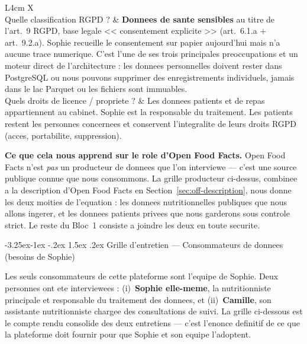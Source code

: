 \documentclass[a4paper,11pt,oneside,openany]{report}
\makeatletter
\renewcommand\subsection{\@startsection{subsection}{2}{\z@}%
  {-3.25ex\@plus -1ex \@minus -.2ex}%
  {1.5ex \@plus .2ex}%
  {\normalfont\large\bfseries\color{ntdarkgreen}}}
\newcommand{\off}{Open Food Facts}
\newcommand{\rgpd}{RGPD}
\makeatother
\begin{document}
\begin{table}[H]
\begin{tabularx}{\textwidth}{L{4cm} X}
\\
\addlinespace
Quelle classification \rgpd{} ? &
\textbf{Donnees de sante sensibles} au titre de l'art.~9 \rgpd{},
base legale << consentement explicite >> (art.~6.1.a $+$ art.~9.2.a).
Sophie recueille le consentement sur papier aujourd'hui mais n'a
aucune trace numerique. C'est l'une de ses trois principales
preoccupations et un moteur direct de l'architecture : les donnees
personnelles doivent rester dans PostgreSQL ou nous pouvons supprimer
des enregistrements individuels, jamais dans le lac Parquet ou les
fichiers sont immuables.
\\
\addlinespace
Quels droits de licence / propriete ? &
Les donnees patients et de repas appartiennent au cabinet. Sophie est
la responsable du traitement. Les patients restent les personnes
concernees et conservent l'integralite de leurs droits \rgpd{}
(acces, portabilite, suppression).
\\
\bottomrule
\end{tabularx}
\end{table}

\noindent\textbf{Ce que cela nous apprend sur le role d'\off{}.} \off{}
n'est \emph{pas} un producteur de donnees que l'on interviewe --- c'est
une source publique connue que nous consommons. La grille producteur
ci-dessus, combinee a la description d'\off{} en
Section~\ref{sec:off-description}, nous donne les deux moities de
l'equation : les donnees nutritionnelles publiques que nous allons
ingerer, et les donnees patients privees que nous garderons sous
controle strict. Le reste du Bloc~1 consiste a joindre les deux en
toute securite.

\subsection{Grille d'entretien --- Consommateurs de donnees (besoins de Sophie)}

Les seuls consommateurs de cette plateforme sont l'equipe de Sophie.
Deux personnes ont ete interviewees : (i)~\textbf{Sophie elle-meme},
la nutritionniste principale et responsable du traitement des donnees,
et (ii)~\textbf{Camille}, son assistante nutritionniste chargee des
consultations de suivi. La grille ci-dessous est le compte rendu
consolide des deux entretiens --- c'est l'enonce definitif de ce que
la plateforme doit fournir pour que Sophie et son equipe l'adoptent.
\end{document}

